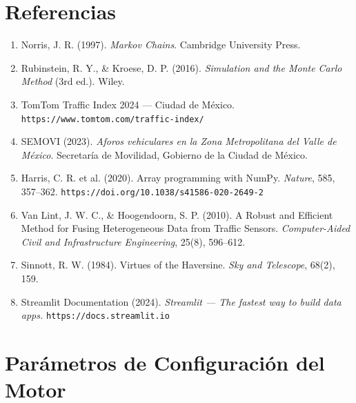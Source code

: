 \documentclass[12pt, a4paper]{article}
\theoremstyle{definition}
\begin{document}
\section*{Referencias}

\begin{enumerate}
    \item Norris, J. R. (1997). \textit{Markov Chains}. Cambridge University Press.

    \item Rubinstein, R. Y., \& Kroese, D. P. (2016).
    \textit{Simulation and the Monte Carlo Method} (3rd ed.). Wiley.

    \item TomTom Traffic Index 2024 — Ciudad de México.
    \texttt{https://www.tomtom.com/traffic-index/}

    \item SEMOVI (2023). \textit{Aforos vehiculares en la Zona Metropolitana del
    Valle de México}. Secretaría de Movilidad, Gobierno de la Ciudad de México.

    \item Harris, C. R. et al. (2020). Array programming with NumPy.
    \textit{Nature}, 585, 357–362.
    \texttt{https://doi.org/10.1038/s41586-020-2649-2}

    \item Van Lint, J. W. C., \& Hoogendoorn, S. P. (2010).
    A Robust and Efficient Method for Fusing Heterogeneous Data from Traffic Sensors.
    \textit{Computer-Aided Civil and Infrastructure Engineering}, 25(8), 596–612.

    \item Sinnott, R. W. (1984). Virtues of the Haversine.
    \textit{Sky and Telescope}, 68(2), 159.

    \item Streamlit Documentation (2024).
    \textit{Streamlit — The fastest way to build data apps.}
    \texttt{https://docs.streamlit.io}
\end{enumerate}

\appendix

\section{Parámetros de Configuración del Motor}
\end{document}
